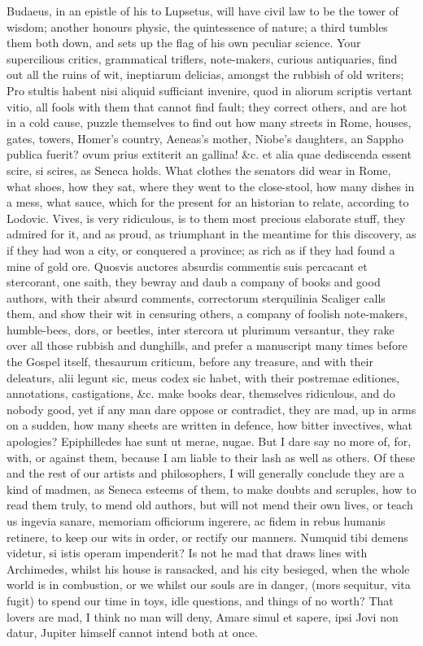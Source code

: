 {Budaeus, in an epistle of his to Lupsetus, will have civil law to be
the tower of wisdom; another honours physic, the quintessence of
nature; a third tumbles them both down, and sets up the flag of his own
peculiar science. Your supercilious critics, grammatical triflers,
note-makers, curious antiquaries, find out all the ruins of wit,
ineptiarum delicias, amongst the rubbish of old writers; Pro
stultis habent nisi aliquid sufficiant invenire, quod in aliorum
scriptis vertant vitio, all fools with them that cannot find fault;
they correct others, and are hot in a cold cause, puzzle themselves to
find out how many streets in Rome, houses, gates, towers, Homer's
country, Aeneas's mother, Niobe's daughters, an Sappho publica fuerit?
ovum prius extiterit an gallina! \&c. et alia quae dediscenda
essent scire, si scires, as Seneca holds. What clothes the
senators did wear in Rome, what shoes, how they sat, where they went to
the close-stool, how many dishes in a mess, what sauce, which for the
present for an historian to relate, according to Lodovic. Vives,
is very ridiculous, is to them most precious elaborate stuff, they
admired for it, and as proud, as triumphant in the meantime for this
discovery, as if they had won a city, or conquered a province; as rich
as if they had found a mine of gold ore. Quosvis auctores absurdis
commentis suis percacant et stercorant, one saith, they bewray and daub
a company of books and good authors, with their absurd comments,
correctorum sterquilinia Scaliger calls them, and show their wit
in censuring others, a company of foolish note-makers, humble-bees,
dors, or beetles, inter stercora ut plurimum versantur, they rake over
all those rubbish and dunghills, and prefer a manuscript many times
before the Gospel itself, thesaurum criticum, before any treasure,
and with their deleaturs, alii legunt sic, meus codex sic habet, with
their postremae editiones, annotations, castigations, \&c. make books
dear, themselves ridiculous, and do nobody good, yet if any man dare
oppose or contradict, they are mad, up in arms on a sudden, how many
sheets are written in defence, how bitter invectives, what apologies?
Epiphilledes hae sunt ut merae, nugae. But I dare say no more of,
for, with, or against them, because I am liable to their lash as well
as others. Of these and the rest of our artists and philosophers, I
will generally conclude they are a kind of madmen, as  Seneca
esteems of them, to make doubts and scruples, how to read them truly,
to mend old authors, but will not mend their own lives, or teach us
ingevia sanare, memoriam officiorum ingerere, ac fidem in rebus humanis
retinere, to keep our wits in order, or rectify our manners. Numquid
tibi demens videtur, si istis operam impenderit? Is not he mad that
draws lines with Archimedes, whilst his house is ransacked, and his
city besieged, when the whole world is in combustion, or we whilst our
souls are in danger, (mors sequitur, vita fugit) to spend our time in
toys, idle questions, and things of no worth?
That lovers are mad, I think no man will deny, Amare simul et
sapere, ipsi Jovi non datur, Jupiter himself cannot intend both at
once.

}
